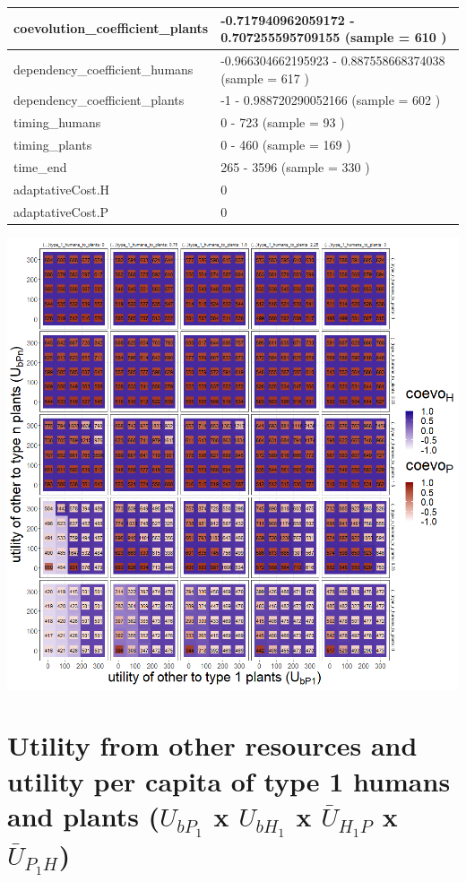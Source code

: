 \documentclass[
]{book}
\begin{document}
\begin{table}[!h]
\begin{tabular}[t]{l|l}
\hline
coevolution\_coefficient\_plants & -0.717940962059172 - 0.707255595709155 (sample = 610 )\\
\hline
dependency\_coefficient\_humans & -0.966304662195923 - 0.887558668374038 (sample = 617 )\\
\hline
dependency\_coefficient\_plants & -1 - 0.988720290052166 (sample = 602 )\\
\hline
timing\_humans & 0 - 723 (sample = 93 )\\
\hline
timing\_plants & 0 - 460 (sample = 169 )\\
\hline
time\_end & 265 - 3596 (sample = 330 )\\
\hline
adaptativeCost.H & 0\\
\hline
adaptativeCost.P & 0\\
\hline
\end{tabular}
\end{table}

\newpage

\includegraphics[width=1\linewidth]{plots/4_exp_utilities_to_plants-tripleRaster_fourParameterss}

\newpage

\hypertarget{utility-from-other-resources-and-utility-per-capita-of-type-1-humans-and-plants-u_bp_1-x-u_bh_1-x-baru_h_1p-x-baru_p_1h}{%
\section{\texorpdfstring{Utility from other resources and utility per capita of type 1 humans and plants (\(U_{bP_{1}}\) x \(U_{bH_{1}}\) x \(\bar{U}_{H_{1}P}\) x \(\bar{U}_{P_{1}H}\))}{Utility from other resources and utility per capita of type 1 humans and plants (U\_\{bP\_\{1\}\} x U\_\{bH\_\{1\}\} x \textbackslash bar\{U\}\_\{H\_\{1\}P\} x \textbackslash bar\{U\}\_\{P\_\{1\}H\})}}\label{utility-from-other-resources-and-utility-per-capita-of-type-1-humans-and-plants-u_bp_1-x-u_bh_1-x-baru_h_1p-x-baru_p_1h}}
\end{document}
